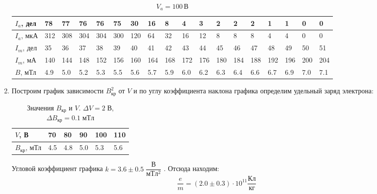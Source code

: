 \documentclass[a4paper,12pt]{article}
\begin{document}
\begin{enumerate}
		\begin{table}[h!]
			\caption{$V_a = 100 \, В$}
			\begin{center}
				\begin{tabular}{|*{18}{l|}} \hline
					$I_a$, дел & 78 & 77 & 76 & 76 & 75 & 30 &	16 & 8 & 4 & 3 & 2 & 2 & 2 & 1 & 1 & 0 & 0 \\ \hline
					$I_a$, мкА & 312 & 308 & 304 & 304 & 300 & 120 & 64 & 32 & 16 & 12 & 8 & 8 & 8 & 4 & 4 & 0 & 0 \\ \hline
					$I_m$, дел & 35 & 36 & 37 &	38 & 39 & 40 & 41 & 42 & 43 & 44 & 45 & 46 & 47 & 48 & 49 & 50 & 51 \\ \hline
					$I_m$, мА & 140 & 144 & 148 & 152 & 156 & 160 & 164 & 168 & 172 & 176 & 180 & 184 & 188 & 192 & 196 & 200 & 204 \\ \hline
					$B$, мТл & 4.9 & 5.0 & 5.2 & 5.3 & 5.5 & 5.6 & 5.7 & 5.9 & 6.0 & 6.2 & 6.3 & 6.4 & 6.6 & 6.7 & 6.9 & 7.0 & 7.1 \\ \hline
				\end{tabular}	
			\end{center}
		\end{table}

		\newpage

		\item Построим график зависимости $B_{кр}^2$ от $V$ и по углу коэффициента наклона графика определим удельный заряд электрона:
		
		\begin{table}[h!]
			\caption{Значения $B_{кр}$ и $V$. $\Delta V =  2\;В$, $\Delta B_{кр} =  0.1\;мТл$}
			\begin{center}
				\begin{tabular}{|*{6}{l|}} \hline
					$V$, В & 70 & 80 & 90 & 100 & 110 \\ \hline
					$B_{кр}$, мТл & 4.5 & 4.8 & 5.0 & 5.3 & 5.6 \\ \hline 
				\end{tabular}	
			\end{center}
		\end{table}

		\begin{figure}[h!]
		\end{figure}
		
		Угловой коэффициент графика $k = 3.6 \pm 0.5 \; \dfrac{В}{мТл^2}$ . Отсюда находим:
	$$\frac{e}{m} = (2.0 \pm 0.3) \cdot 10^{11} \frac{\text{Кл}}{\text{кг}}$$
		

\end{enumerate}
\end{document}
